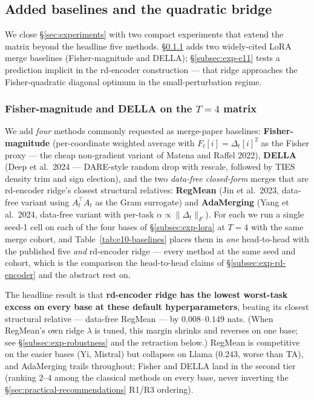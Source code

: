
\subsection{Added baselines and the quadratic bridge}
\label{subsec:exp-e10-e11}

We close \S\ref{sec:experiments} with two compact experiments that
extend the matrix beyond the headline five methods. \S\ref{subsec:exp-e10}
adds two widely-cited LoRA merge baselines (Fisher-magnitude and DELLA);
\S\ref{subsec:exp-e11} tests a prediction implicit in the rd-encoder
construction --- that ridge approaches the Fisher-quadratic diagonal
optimum in the small-perturbation regime.

\subsubsection{Fisher-magnitude and DELLA on the $T=4$ matrix}
\label{subsec:exp-e10}

We add \emph{four} methods commonly requested as merge-paper
baselines: \textbf{Fisher-magnitude} (per-coordinate weighted average
with $F_t[i] = \Delta_t[i]^2$ as the Fisher proxy --- the cheap
non-gradient variant of Matena and Raffel 2022), \textbf{DELLA}
(Deep et al.\ 2024 --- DARE-style random drop with rescale, followed by
TIES density trim and sign election), and the two \emph{data-free
closed-form} merges that are rd-encoder ridge's closest structural
relatives: \textbf{RegMean} (Jin et al.\ 2023, data-free variant using
$A_t^\top A_t$ as the Gram surrogate) and \textbf{AdaMerging}
(Yang et al.\ 2024, data-free variant with per-task
$\alpha \propto \|\Delta_t\|_F$). For each we run a single seed-1 cell
on each of the four bases of \S\ref{subsec:exp-lora} at $T = 4$ with
the same merge cohort, and Table~\ref{tab:e10-baselines} places them in
\emph{one} head-to-head with the published five \emph{and}
rd-encoder ridge --- every method at the same seed and cohort, which is
the comparison the head-to-head claims of \S\ref{subsec:exp-rd-encoder}
and the abstract rest on.

The headline result is that \textbf{rd-encoder ridge has the lowest
worst-task excess on every base at these default hyperparameters},
beating its closest structural relative --- data-free RegMean --- by
$0.008$--$0.149$ nats. (When RegMean's own ridge $\lambda$ is tuned,
this margin shrinks and reverses on one base; see
\S\ref{subsec:exp-robustness} and the retraction below.) RegMean is
competitive on the easier bases (Yi, Mistral) but collapses on Llama
($0.243$, worse than TA), and AdaMerging trails throughout; Fisher and
DELLA land in the second tier (ranking $2$--$4$ among the classical
methods on every base, never inverting the
\S\ref{sec:practical-recommendations} R1/R3 ordering).

